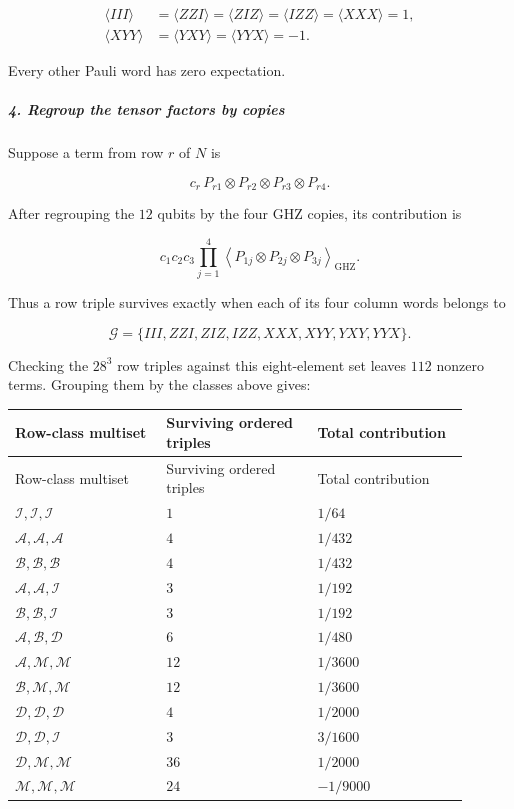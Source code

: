 \[
\begin{aligned}
\langle III\rangle
&=\langle ZZI\rangle
=\langle ZIZ\rangle
=\langle IZZ\rangle
=\langle XXX\rangle=1,\\
\langle XYY\rangle
&=\langle YXY\rangle
=\langle YYX\rangle=-1.
\end{aligned}
\]

Every other Pauli word has zero expectation.

\subparagraph*{4. Regroup the tensor factors by copies}

Suppose a term from row $r$ of $N$ is

\[
c_r\,P_{r1}\otimes P_{r2}\otimes P_{r3}\otimes P_{r4}.
\]

After regrouping the $12$ qubits by the four GHZ copies, its contribution is

\[
c_1c_2c_3 \prod_{j=1}^{4} \left\langle P_{1j}\otimes P_{2j}\otimes P_{3j} \right\rangle_{\mathrm{GHZ}}.
\]

Thus a row triple survives exactly when each of its four column words belongs to

\[
\mathcal G= \{III,ZZI,ZIZ,IZZ,XXX,XYY,YXY,YYX\}.
\]

Checking the $28^3$ row triples against this eight-element set leaves $112$ nonzero terms. Grouping them by the classes above gives:

\begingroup
\setlength{\tabcolsep}{3pt}
\begin{longtable}{@{}>{\raggedright\arraybackslash}p{0.300\linewidth} >{\raggedright\arraybackslash}p{0.300\linewidth} >{\raggedright\arraybackslash}p{0.300\linewidth}@{}}
\toprule
Row-class multiset & Surviving ordered triples & Total contribution \\
\midrule
\endfirsthead
\toprule
Row-class multiset & Surviving ordered triples & Total contribution \\
\midrule
\endhead
$\mathcal I,\mathcal I,\mathcal I$ & $1$ & $1/64$ \\
$\mathcal A,\mathcal A,\mathcal A$ & $4$ & $1/432$ \\
$\mathcal B,\mathcal B,\mathcal B$ & $4$ & $1/432$ \\
$\mathcal A,\mathcal A,\mathcal I$ & $3$ & $1/192$ \\
$\mathcal B,\mathcal B,\mathcal I$ & $3$ & $1/192$ \\
$\mathcal A,\mathcal B,\mathcal D$ & $6$ & $1/480$ \\
$\mathcal A,\mathcal M,\mathcal M$ & $12$ & $1/3600$ \\
$\mathcal B,\mathcal M,\mathcal M$ & $12$ & $1/3600$ \\
$\mathcal D,\mathcal D,\mathcal D$ & $4$ & $1/2000$ \\
$\mathcal D,\mathcal D,\mathcal I$ & $3$ & $3/1600$ \\
$\mathcal D,\mathcal M,\mathcal M$ & $36$ & $1/2000$ \\
$\mathcal M,\mathcal M,\mathcal M$ & $24$ & $-1/9000$ \\
\bottomrule
\end{longtable}
\endgroup

